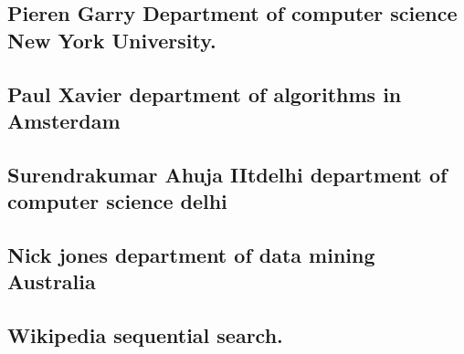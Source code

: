 \documentclass{article}
\begin{document}
\subsection{Pieren Garry Department of computer science New York University.}
\subsection{Paul Xavier department of algorithms in Amsterdam}
\subsection{Surendrakumar Ahuja IItdelhi department of computer science delhi}
\subsection{Nick jones department of data mining Australia}
\subsection{Wikipedia sequential search.}
\end{document}
